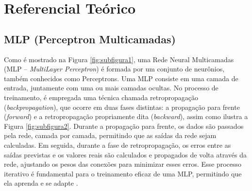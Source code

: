 

\chapter{Referencial Teórico}
\label{chap:referencial-teorico}

\section{MLP (Perceptron Multicamadas)}

Como é mostrado na Figura \ref{fig:subfigura1}, uma Rede Neural Multicamadas (MLP – \textit{MultiLayer Perceptron})
é formada por um conjunto de neurônios, também conhecidos como
Perceptrons. Uma MLP consiste em uma camada de entrada, juntamente com uma ou mais camadas ocultas.
No processo de treinamento, é empregada uma técnica chamada retropropagação (\textit{backpropagation}), que
ocorre em duas fases distintas: a propagação para frente (\textit{forward}) e a retropropagação propriamente
dita (\textit{backward}), assim como ilustra a Figura \ref{fig:subfigura2}. Durante a propagação para frente, os dados são passados pela rede, camada por camada,
permitindo que as saídas da rede sejam calculadas. Em seguida, durante a fase de retropropagação, os
erros entre as saídas previstas e os valores reais são calculados e propagados de volta através da rede,
ajustando os pesos das conexões para minimizar esses erros. Esse processo iterativo é fundamental para o
treinamento eficaz de uma MLP, permitindo que ela aprenda e se adapte \cite{su12114776}.  

